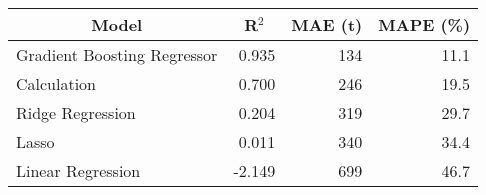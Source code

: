 
\begin{tabular}[t]{lrrr}
\toprule
\multicolumn{1}{c}{Model} & \multicolumn{1}{c}{R$^2$} & \multicolumn{1}{c}{MAE (t)} & \multicolumn{1}{c}{MAPE (\%)}\\
\midrule
Gradient Boosting Regressor & 0.935 & 134 & 11.1\\
Calculation & 0.700 & 246 & 19.5\\
Ridge Regression & 0.204 & 319 & 29.7\\
Lasso & 0.011 & 340 & 34.4\\
Linear Regression & -2.149 & 699 & 46.7\\
\bottomrule
\end{tabular}
